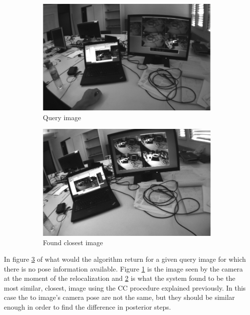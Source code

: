 \begin{figure}[!htpb]
  \centering
  \begin{subfigure}[b]{0.6\linewidth}
    \includegraphics[width=\linewidth]{img/query_1.png}
    \caption{Query image}
    \label{fig:query_1}
  \end{subfigure}
  \quad
  \begin{subfigure}[b]{0.6\linewidth}
    \includegraphics[width=\linewidth]{img/best_match_1.png}
    \caption{Found closest image}
    \label{fig:best_match_1}
  \end{subfigure}
  \caption{}
  \label{fig:cc_example}
\end{figure}


In figure \ref{fig:cc_example} of what would the algorithm return for a given query image for which there is no pose information available. Figure \ref{fig:query_1} is the image seen by the camera at the moment of the relocalization and \ref{fig:best_match_1} is what the system found to be the most similar, closest, image using the CC procedure explained previously. In this case the to image's camera pose are not the same, but they should be similar enough in order to find the difference in posterior steps.\\

